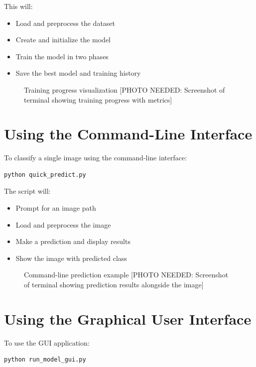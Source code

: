 \documentclass[11pt,a4paper]{report}
\begin{document}
This will:
\begin{itemize}
    \item Load and preprocess the dataset
    \item Create and initialize the model
    \item Train the model in two phases
    \item Save the best model and training history
\end{itemize}

\begin{figure}[H]
    \centering
    \fbox{\rule{0pt}{8cm}\rule{12cm}{0pt}}
    \caption{Training progress visualization [PHOTO NEEDED: Screenshot of terminal showing training progress with metrics]}
    \label{fig:training_progress}
\end{figure}

\section{Using the Command-Line Interface}
To classify a single image using the command-line interface:

\begin{lstlisting}[language=bash]
python quick_predict.py
\end{lstlisting}

The script will:
\begin{itemize}
    \item Prompt for an image path
    \item Load and preprocess the image
    \item Make a prediction and display results
    \item Show the image with predicted class
\end{itemize}

\begin{figure}[H]
    \centering
    \fbox{\rule{0pt}{8cm}\rule{12cm}{0pt}}
    \caption{Command-line prediction example [PHOTO NEEDED: Screenshot of terminal showing prediction results alongside the image]}
    \label{fig:cli_prediction}
\end{figure}

\section{Using the Graphical User Interface}
To use the GUI application:

\begin{lstlisting}[language=bash]
python run_model_gui.py
\end{lstlisting}
\end{document}

